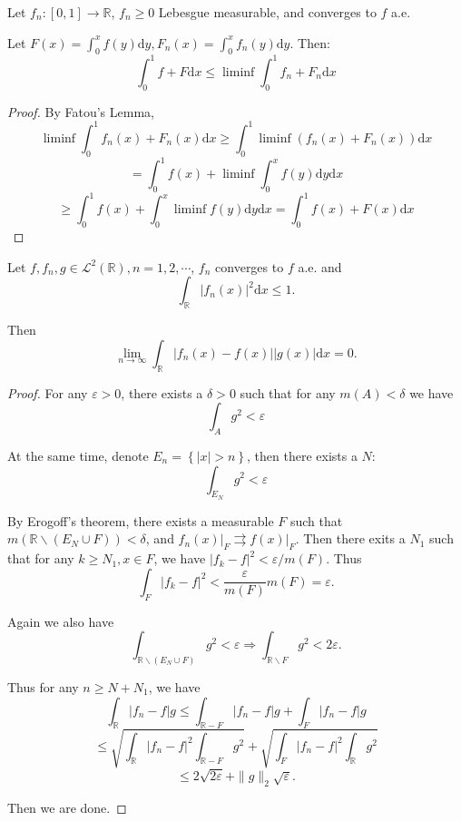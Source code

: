 \begin{problem}
Let $ f_{n}\colon [0,1]\to \mathbb{R} $, $f_{n}\ge 0 $ Lebesgue measurable, and converges to $ f $ a.e.

Let $ F(x)=\int_{0}^{x}f(y)\mathrm{d} y,F_{n}(x)=\int _{0}^{x}f_{n}(y)\mathrm{d} y $. Then:
$$
	\int_0^1{f+F\mathrm{d} x}\le \liminf \int_0^1{f_n+F_n\mathrm{d} x}
$$
\end{problem}

\begin{proof}
	By Fatou's Lemma,
	$$
		\liminf \int_0^1{f_n( x ) +F_n( x ) \mathrm{d} x}\ge \int_0^1{\liminf ( f_n( x ) +F_n( x ) ) \mathrm{d} x}
	$$
	$$
		=\int_0^1{f( x ) +\liminf \int_0^x{f( y ) \mathrm{d} y}\mathrm{d} x}
	$$
	$$
		\ge \int_0^1{f( x ) +\int_0^x{\liminf f( y ) \mathrm{d} y}\mathrm{d} x}=\int_0^1{f( x ) +F( x ) \mathrm{d} x}
	$$
\end{proof}

\begin{problem}
Let $ f,f_{n},g\in \mathcal{L} ^{2}(\mathbb{R} ),n=1,2,\cdots $, $ f_{n} $ converges to $ f $ a.e. and
$$
	\int_{\mathbb{R}}^{}{\vert f_n( x ) \vert ^2\mathrm{d} x}\le 1.
$$

Then
$$
	\lim_{n\rightarrow \infty}\int_{\mathbb{R}}^{}{\vert f_n( x ) -f( x ) \vert \vert g (x) \vert \mathrm{d} x}=0.
$$
\end{problem}

\begin{proof}
	For any $ \varepsilon> 0 $, there exists a $ \delta>0 $ such that for any $ m(A)<\delta $ we have
	$$
		\int_A^{}{g^2}<\varepsilon
	$$


	At the same time, denote $
		E_n=\left\{ |x|>n \right\}
	$, then there exists a $ N $:
	$$
		\int_{E_N}^{}{g^2}<\varepsilon
	$$

	By Erogoff's theorem, there exists a measurable $ F $ such that $ m(\mathbb{R} \backslash (E_{N}\cup F))<\delta $, and $ f_{n}(x)\vert_{F}\rightrightarrows f(x)\vert_{F} $. Then there exits a $ N_{1} $ such that for any $ k\ge N_{1},x\in F $, we have $ \vert f_{k}-f \vert^{2}<\varepsilon/m(F) $. Thus
	$$
		\int_F^{}{|f_k-f|^2}<\frac{\varepsilon}{m( F )}m( F ) =\varepsilon.
	$$

	Again we also have
	$$
		\int_{\mathbb{R} \backslash (E_{N}\cup F)}^{}{g^2}<\varepsilon \Rightarrow \int_{\mathbb{R} \backslash F}^{}{g^2}<2\varepsilon.
	$$

	Thus for any $ n\ge N+N_{1} $, we have
	$$
		\int_{\mathbb{R}}^{}{|f_n-f|g}\le \int_{\mathbb{R}-F}^{}{|f_n-f|g}+\int_F^{}{|f_n-f|g}
	$$
	$$
		\le \sqrt{\int_{\mathbb{R}}^{}{|f_n-f|^2}\int_{\mathbb{R}-F}^{}{g^2}}+\sqrt{\int_F^{}{|f_n-f|^2}\int_{\mathbb{R}}^{}{g^2}}
	$$
	$$
		\le 2\sqrt{2\varepsilon}+\|g\|_2\sqrt{\varepsilon}.
	$$

	Then we are done.
\end{proof}

